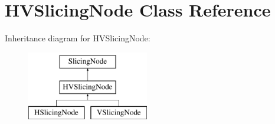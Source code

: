 \hypertarget{class_open_chams_1_1_h_v_slicing_node}{}\section{H\+V\+Slicing\+Node Class Reference}
\label{class_open_chams_1_1_h_v_slicing_node}
Inheritance diagram for H\+V\+Slicing\+Node\+:\begin{figure}[H]
\begin{center}
\leavevmode
\includegraphics[height=3.000000cm]{class_open_chams_1_1_h_v_slicing_node}
\end{center}
\end{figure}
